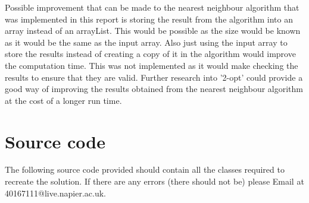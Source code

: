 \documentclass[conference,backref=page]{acmsiggraph}
\begin{document}
Possible improvement that can be made to the nearest neighbour algorithm that was implemented in this report is storing the result from the algorithm into an array instead of an arrayList. This would be possible as the size would be known as it would be the same as the input array. Also just using the input array to store the results instead of creating a copy of it in the algorithm would improve the computation time. This was not implemented as it would make checking the results to ensure that they are valid. Further research into '2-opt' could provide a good way of improving the results obtained from the nearest neighbour algorithm at the cost of a longer run time.

\newpage

\section{Source code}
 The following source code provided should contain all the classes required to recreate the solution. If there are any errors (there should not be) please Email at 40167111@live.napier.ac.uk.
 
\end{document}
